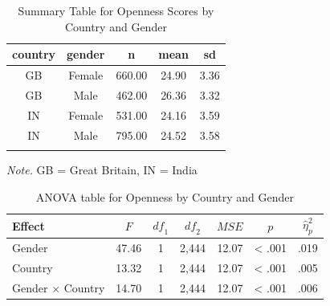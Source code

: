 \documentclass[
  english,
  man, fleqn, noextraspace]{apa6}
\begin{document}
\begin{table}[tbp]

\begin{center}
\begin{threeparttable}

\caption{\label{tab:anovaDescriptives}Summary Table for Openness Scores by Country and Gender}

\begin{tabular}{ccccc}
\toprule
country & \multicolumn{1}{c}{gender} & \multicolumn{1}{c}{n} & \multicolumn{1}{c}{mean} & \multicolumn{1}{c}{sd}\\
\midrule
GB & Female & 660.00 & 24.90 & 3.36\\
GB & Male & 462.00 & 26.36 & 3.32\\
IN & Female & 531.00 & 24.16 & 3.59\\
IN & Male & 795.00 & 24.52 & 3.58\\
\bottomrule
\addlinespace
\end{tabular}

\begin{tablenotes}[para]
\normalsize{\textit{Note.} GB = Great Britain, IN = India}
\end{tablenotes}

\end{threeparttable}
\end{center}

\end{table}

\begin{table}[tbp]

\begin{center}
\begin{threeparttable}

\caption{\label{tab:anovaResults}ANOVA table for Openness by Country and Gender}

\begin{tabular}{lrcrrrl}
\toprule
Effect & \multicolumn{1}{c}{$F$} & \multicolumn{1}{c}{$\mathit{df}_1$} & \multicolumn{1}{c}{$\mathit{df}_2$} & \multicolumn{1}{c}{$\mathit{MSE}$} & \multicolumn{1}{c}{$p$} & \multicolumn{1}{c}{$\hat{\eta}^2_p$}\\
\midrule
Gender & 47.46 & 1 & 2,444 & 12.07 & < .001 & .019\\
Country & 13.32 & 1 & 2,444 & 12.07 & < .001 & .005\\
Gender $\times$ Country & 14.70 & 1 & 2,444 & 12.07 & < .001 & .006\\
\bottomrule
\end{tabular}

\end{threeparttable}
\end{center}

\end{table}
\end{document}
